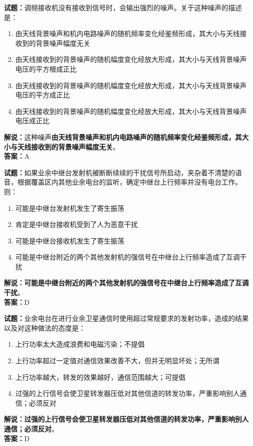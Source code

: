 \documentclass{ctexbook}
\begin{document}
\bigskip


\noindent\textbf{试题：}调频接收机没有接收到信号时，会输出强烈的噪声。关于这种噪声的描述是：
\begin{enumerate}[leftmargin=3em]
\item 由天线背景噪声和机内电路噪声的随机频率变化经鉴频形成，其大小与天线接收到的背景噪声幅度无关
\item 由天线接收到的背景噪声的随机幅度变化经放大形成，其大小与天线背景噪声电压的平方根成正比
\item 由天线接收到的背景噪声的随机幅度变化经放大形成，其大小与天线背景噪声电压的平方成正比
\item 由天线接收到的背景噪声的随机幅度变化经放大形成，其大小与天线背景噪声电压成正比
\end{enumerate}
\noindent\textbf{解说：}这种噪声\textbf{由天线背景噪声和机内电路噪声的随机频率变化经鉴频形成，其大小与天线接收到的背景噪声幅度无关}。\\\noindent\textbf{答案：}A


\bigskip


\noindent\textbf{试题：}如果业余中继台发射机被断断续续的干扰信号所启动，夹杂着不清楚的语音，根据覆盖区内其他业余电台的监听，确定中继台上行频率并没有电台工作。则：
\begin{enumerate}[leftmargin=3em]
\item 可能是中继台发射机发生了寄生振荡
\item 肯定是中继台接收机受到了人为恶意干扰
\item 可能是中继台接收机发生了寄生振荡
\item 可能是中继台附近的两个其他发射机的强信号在中继台上行频率造成了互调干扰
\end{enumerate}
\noindent\textbf{解说：可能是中继台附近的两个其他发射机的强信号在中继台上行频率造成了互调干扰}。\\\noindent\textbf{答案：}D



\bigskip


\noindent\textbf{试题：}业余电台在进行业余卫星通信时使用超过常规要求的发射功率，造成的结果以及对这种做法的态度是：
\begin{enumerate}[leftmargin=3em]
\item 上行功率太大造成浪费和电磁污染；不提倡
\item 上行功率超过一定值对通信效果改善不大，但并无明显坏处；无所谓
\item 上行功率越大，转发的效果越好，通信范围越大；可提倡
\item 过强的上行信号会使卫星转发器压低对其他信道的转发功率，严重影响别人通信；必须反对
\end{enumerate}
\noindent\textbf{解说：}\textbf{过强的上行信号会使卫星转发器压低对其他信道的转发功率，严重影响别人通信；必须反对}。\\\noindent\textbf{答案：}D
\end{document}

